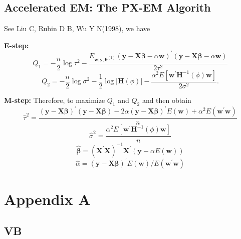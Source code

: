 \documentclass[
]{article}
\begin{document}
\hypertarget{accelerated-em-the-px-em-algorith}{%
\subsection{Accelerated EM: The PX-EM
Algorith}\label{accelerated-em-the-px-em-algorith}}

See Liu C, Rubin D B, Wu Y N(1998), we have

\textbf{E-step:}
\[Q_1=-\frac{n}{2}\log \tau^2-\frac{E_{\bm{w|y,\theta^{(t)}}}(\bm{y} - \bm{X\beta} - \alpha \bm{w})^\prime(\bm{y} - \bm{X\beta} - \alpha \bm{w})} {2\tau^2}\]
\[Q_2=-\frac{n}{2}\log \sigma^2-\frac{1}{2}\log |\bm{H}(\phi)|-\frac{\alpha^2E[\bm{w^\prime}\bm{H}^{-1}(\phi)\bm{w}]}{2\sigma^2}.\]

\textbf{M-step:} Therefore, to maximize \(Q_1\) and \(Q_2\) and then
obtain \begin{equation}
     \hat{\tau}^2=\frac{(\bm{y} - \bm{X\beta})^\prime(\bm{y} - \bm{X\beta})-2\alpha(\bm{y} -   \bm{X\beta})^\prime  E(\bm{w}) + \alpha^2 E(\bm{w^\prime w})}{n}
  \end{equation} \begin{equation}
    \hat{\sigma}^2=\frac{\alpha^2 E[\bm{w^\prime}\bm{H}^{-1}(\phi)\bm{w}]}{n}
  \end{equation} \begin{equation}
     \hat{\bm{\beta}}=(\bm{X}^\prime \bm{X})^{- 1}\bm{X}^\prime (\bm{y} - \alpha E(\bm{w}))
  \end{equation} \begin{equation}
     \hat{\alpha}=(\bm{y} - \bm{X\beta})^\prime E(\bm{w})/ E(\bm{w^\prime w})
  \end{equation}

\hypertarget{appendix-a}{%
\section{Appendix A}\label{appendix-a}}

\hypertarget{vb}{%
\subsection{VB}\label{vb}}
\end{document}

